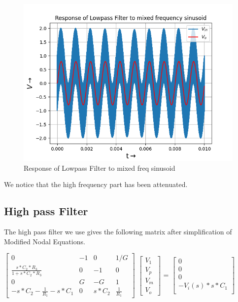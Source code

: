 \documentclass{article}
\begin{document}
\begin{figure}[h!]
	\centering
	\includegraphics[scale=0.55]{Figure_4}
	\caption{Response of Lowpass Filter to mixed freq sinusoid}
	\label{fig:Response of Lowpass Filter to mixed freq sinusoid}
\end{figure}
We notice that the high frequency part has been attenuated.



\clearpage
\subsection{High pass Filter}

The high pass filter we use gives the following matrix after simplification of Modified Nodal Equations.
\newline

$\begin{bmatrix}
    0   & -1 & 0  & 1/G \\
    \frac{s*C_2*R_3}{1+s*C_2*R_3}  & 0 & -1 & 0\\
    0  & G & -G & 1 \\
    -s*C_2 - \frac{1}{R_1} - s*C_1 & 0 & s*C_2 & \frac{1}{R_1}
\end{bmatrix}$
$\begin{bmatrix}
    V_1\\
    V_p\\
    V_m \\
    V_o
\end{bmatrix}$
=
$\begin{bmatrix}
    0 \\
    0 \\
    0 \\
    -V_i(s)*s*C_1 \\
    
\end{bmatrix}$
\newline
\newline
\end{document}
